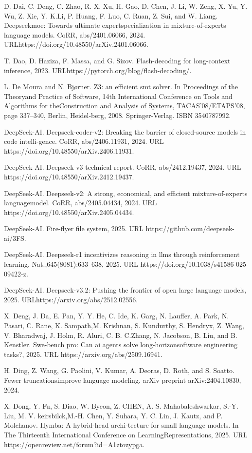 \documentclass[
  10
]{article}
\begin{document}
D. Dai, C. Deng, C. Zhao, R. X. Xu, H. Gao, D. Chen, J. Li, W. Zeng, X.
Yu, Y. Wu, Z. Xie, Y. K.Li, P. Huang, F. Luo, C. Ruan, Z. Sui, and W.
Liang. Deepseekmoe: Towards ultimate expertspecialization in
mixture-of-experts language models. CoRR, abs/2401.06066, 2024.
URLhttps://doi.org/10.48550/arXiv.2401.06066.

T. Dao, D. Haziza, F. Massa, and G. Sizov. Flash-decoding for
long-context inference, 2023.
URLhttps://pytorch.org/blog/flash-decoding/.

L. De Moura and N. Bjørner. Z3: an efficient smt solver. In Proceedings
of the Theoryand Practice of Software, 14th International Conference on
Tools and Algorithms for theConstruction and Analysis of Systems,
TACAS'08/ETAPS'08, page 337--340, Berlin, Heidel-berg, 2008.
Springer-Verlag. ISBN 3540787992.

DeepSeek-AI. Deepseek-coder-v2: Breaking the barrier of closed-source
models in code intelli-gence. CoRR, abs/2406.11931, 2024. URL
https://doi.org/10.48550/arXiv.2406.11931.

DeepSeek-AI. Deepseek-v3 technical report. CoRR, abs/2412.19437, 2024.
URL https://doi.org/10.48550/arXiv.2412.19437.

DeepSeek-AI. Deepseek-v2: A strong, economical, and efficient
mixture-of-experts languagemodel. CoRR, abs/2405.04434, 2024. URL
https://doi.org/10.48550/arXiv.2405.04434.

DeepSeek-AI. Fire-flyer file system, 2025. URL
https://github.com/deepseek-ai/3FS.

DeepSeek-AI. Deepseek-r1 incentivizes reasoning in llms through
reinforcement learning. Nat.,645(8081):633--638, 2025. URL
https://doi.org/10.1038/s41586-025-09422-z.

DeepSeek-AI. Deepseek-v3.2: Pushing the frontier of open large language
models, 2025. URLhttps://arxiv.org/abs/2512.02556.

X. Deng, J. Da, E. Pan, Y. Y. He, C. Ide, K. Garg, N. Lauffer, A. Park,
N. Pasari, C. Rane, K. Sampath,M. Krishnan, S. Kundurthy, S. Hendryx, Z.
Wang, V. Bharadwaj, J. Holm, R. Aluri, C. B. C.Zhang, N. Jacobson, B.
Liu, and B. Kenstler. Swe-bench pro: Can ai agents solve
long-horizonsoftware engineering tasks?, 2025. URL
https://arxiv.org/abs/2509.16941.

H. Ding, Z. Wang, G. Paolini, V. Kumar, A. Deoras, D. Roth, and S.
Soatto. Fewer truncationsimprove language modeling. arXiv preprint
arXiv:2404.10830, 2024.

X. Dong, Y. Fu, S. Diao, W. Byeon, Z. CHEN, A. S. Mahabaleshwarkar,
S.-Y. Liu, M. V. keirsbilck,M.-H. Chen, Y. Suhara, Y. C. Lin, J. Kautz,
and P. Molchanov. Hymba: A hybrid-head archi-tecture for small language
models. In The Thirteenth International Conference on
LearningRepresentations, 2025. URL
https://openreview.net/forum?id=A1ztozypga.
\end{document}
